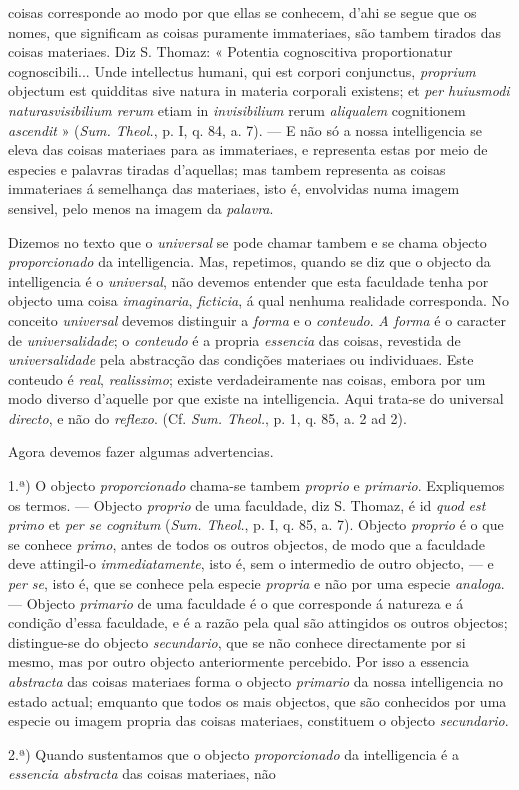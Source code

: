 coisas corresponde ao modo por que ellas se conhecem, d'ahi se segue que os nomes, que significam as coisas puramente immateriaes, são tambem tirados das coisas materiaes. Diz S. Thomaz: « Potentia cognoscitiva proportionatur cognoscibili... Unde intellectus humani, qui est corpori conjunctus, \emph{proprium} objectum est quidditas sive natura in materia corporali existens; et \emph{per huiusmodi naturas}\emph{visibilium rerum} etiam in \emph{invisibilium} rerum \emph{aliqualem} cognitionem \emph{ascendit} » (\emph{Sum. Theol.}, p. I, q. 84, a. 7). --- E não só a nossa intelligencia se eleva das coisas materiaes para as immateriaes, e representa estas por meio de especies e palavras tiradas d'aquellas; mas tambem representa as coisas immateriaes á semelhança das materiaes, isto é, envolvidas numa imagem sensivel, pelo menos na imagem da \emph{palavra}.\par Dizemos no texto que o \emph{universal} se pode chamar tambem e se chama objecto \emph{proporcionado} da intelligencia. Mas, repetimos, quando se diz que o objecto da intelligencia é o \emph{universal}, não devemos entender que esta faculdade tenha por objecto uma coisa \emph{imaginaria}, \emph{ficticia}, á qual nenhuma realidade corresponda. No conceito \emph{universal} devemos distinguir a \emph{forma} e o \emph{conteudo}. \emph{A forma} é o caracter de \emph{universalidade}; o \emph{conteudo} é a propria \emph{essencia} das coisas, revestida de \emph{universalidade} pela abstracção das condições materiaes ou individuaes. Este conteudo é \emph{real}, \emph{realissimo}; existe verdadeiramente nas coisas, embora por um modo diverso d'aquelle por que existe na intelligencia. Aqui trata-se do universal \emph{directo}, e não do \emph{reflexo}. (Cf. \emph{Sum. Theol.}, p. 1, q. 85, a. 2 ad 2).\par Agora devemos fazer algumas advertencias.\par 1.ª) O objecto \emph{proporcionado} chama-se tambem \emph{proprio} e \emph{primario}. Expliquemos os termos. --- Objecto \emph{proprio} de uma faculdade, diz S. Thomaz, é id \emph{quod est primo} et \emph{per se cognitum} (\emph{Sum. Theol.}, p. I, q. 85, a. 7). Objecto \emph{proprio} é o que se conhece \emph{primo}, antes de todos os outros objectos, de modo que a faculdade deve attingil-o \emph{immediatamente}, isto é, sem o intermedio de outro objecto, --- e \emph{per se}, isto é, que se conhece pela especie \emph{propria} e não por uma especie \emph{analoga}. --- Objecto \emph{primario} de uma faculdade é o que corresponde á natureza e á condição d'essa faculdade, e é a razão pela qual são attingidos os outros objectos; distingue-se do objecto \emph{secundario}, que se não conhece directamente por si mesmo, mas por outro objecto anteriormente percebido. Por isso a essencia \emph{abstracta} das coisas materiaes forma o objecto \emph{primario} da nossa intelligencia no estado actual; emquanto que todos os mais objectos, que são conhecidos por uma especie ou imagem propria das coisas materiaes, constituem o objecto \emph{secundario}.\par 2.ª) Quando sustentamos que o objecto \emph{proporcionado} da intelligencia é a \emph{essencia abstracta} das coisas materiaes, não 